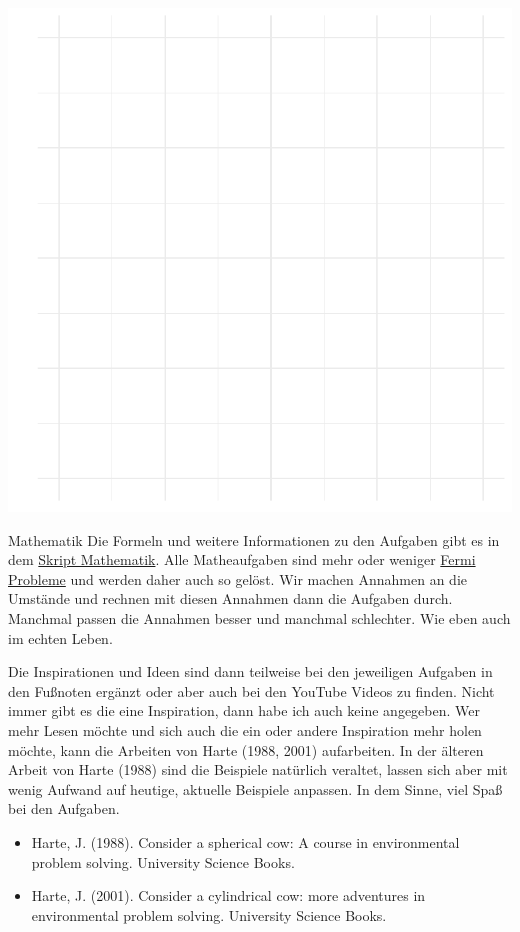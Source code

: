 \documentclass[a4paper, 9pt]{scrartcl}\usepackage[]{graphicx}\usepackage[]{xcolor}
\makeatletter
\def\maxwidth{ %
  \ifdim\Gin@nat@width>\linewidth
    \linewidth
  \else
    \Gin@nat@width
  \fi
}
\makeatother
\begin{document}
{\centering \includegraphics[width=\maxwidth]{img/modeling-R-01-1} 

}


 
\clearpage
\begin{graybox}{Mathematik}
Die Formeln und weitere Informationen zu den Aufgaben gibt es in dem \href{https://jkruppa.github.io/math/}{Skript Mathematik}. Alle Matheaufgaben sind mehr oder weniger \href{https://de.wikipedia.org/wiki/Fermi-Problem}{Fermi Probleme} und werden daher auch so gelöst. Wir machen Annahmen an die Umstände und rechnen mit diesen Annahmen dann die Aufgaben durch. Manchmal passen die Annahmen besser und manchmal schlechter. Wie eben auch im echten Leben.

Die Inspirationen und Ideen sind dann teilweise bei den jeweiligen Aufgaben in den Fußnoten ergänzt oder aber auch bei den YouTube Videos zu finden. Nicht immer gibt es die eine Inspiration, dann habe ich auch keine angegeben. Wer mehr Lesen möchte und sich auch die ein oder andere Inspiration mehr holen möchte, kann die Arbeiten von Harte (1988, 2001) aufarbeiten. In der älteren Arbeit von Harte (1988) sind die Beispiele natürlich veraltet, lassen sich aber mit wenig Aufwand auf heutige, aktuelle Beispiele anpassen. In dem Sinne, viel Spaß bei den Aufgaben.

\begin{itemize}
\item Harte, J. (1988). Consider a spherical cow: A course in environmental problem solving. University Science Books.
\item Harte, J. (2001). Consider a cylindrical cow: more adventures in environmental problem solving. University Science Books.
\end{itemize}
\end{graybox}
\clearpage
\end{document}
